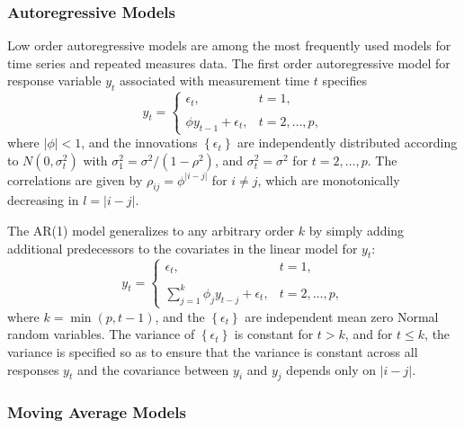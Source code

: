 
\subsubsection{Autoregressive Models}

Low order autoregressive models are among the most frequently used models for time series and repeated measures data. The first order autoregressive model for response variable $y_t$ associated with measurement time $t$ specifies
\begin{equation}\label{eq:ar-1-model}
y_{t} = \left\{ \begin{array}{ll}
 \epsilon_t, & t = 1,\\
& \\
 \phi y_{t-1} + \epsilon_t, & t = 2,\dots, p,
\end{array}\right.
\end{equation}
\noindent 
where $\vert \phi \vert < 1$, and the innovations $\left\{\epsilon_t\right\}$ are independently distributed according to $N\left(0,\sigma_t^2\right)$ with $\sigma_1^2 = \sigma^2/\left(1-\rho^2\right)$, and $\sigma_t^2 = \sigma^2$ for $t = 2, \dots, p$. The correlations are given by $\rho_{ij} = \phi^{\vert i - j \vert}$ for $i \ne j$, which are monotonically decreasing in $l = \vert i-j \vert$. 

\bigskip

The AR(1) model generalizes to any arbitrary order $k$ by simply adding additional predecessors to the covariates in the linear model for $y_t$:
\begin{equation*}
y_{t} = \left\{ \begin{array}{ll}
\epsilon_t, & t = 1,\\
& \\
\sum\limits_{j = 1}^{k} \phi_jy_{t-j} + \epsilon_t, & t = 2, \dots, p,
\end{array}\right.
\end{equation*}
\noindent
where $k = \min\left(p,t-1\right)$, and the $\left\{\epsilon_t\right\}$ are independent mean zero Normal random variables. The variance of $\left\{\epsilon_t\right\}$ is constant for $t > k$, and for $t \le k$, the variance is specified so as to ensure that the variance is constant across all responses $y_t$ and the covariance between $y_i$ and $y_j$ depends only on $\vert i - j\vert$. 

\subsubsection{Moving Average Models}

